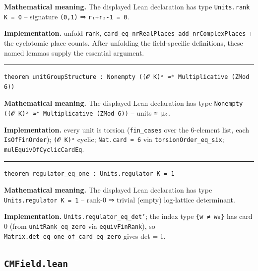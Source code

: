 \documentclass[UTF8,a4paper,11pt,fontset=fandol]{ctexart}
\theoremstyle{definition}
\newcommand{\statementsep}{\par\medskip\hrule\medskip}
\begin{document}
\noindent\textbf{Mathematical meaning.} The displayed Lean declaration has type \texttt{Units.\allowbreak{}rank K = 0} -- signature \texttt{(0,1)} ⇒ \texttt{r₁+r₂-1 = 0}.\par
\noindent\textbf{Implementation.} unfold \texttt{rank}, \texttt{card\_\allowbreak{}eq\_\allowbreak{}nrRealPlaces\_\allowbreak{}add\_\allowbreak{}nrComplexPlaces} + the cyclotomic place counts. After unfolding the field-specific definitions, these named lemmas supply the essential argument.\par
\statementsep
\begin{verbatim}
theorem unitGroupStructure : Nonempty ((𝓞 K)ˣ ≃* Multiplicative (ZMod 6))
\end{verbatim}
\noindent\textbf{Mathematical meaning.} The displayed Lean declaration has type \texttt{Nonempty ((𝓞 K)ˣ ≃* Multiplicative (ZMod 6))} -- units \texttt{≅ μ₆}.\par
\noindent\textbf{Implementation.} every unit is torsion (\texttt{fin\_\allowbreak{}cases} over the 6-element list, each \texttt{IsOfFinOrder}); \texttt{(𝓞 K)ˣ} cyclic; \texttt{Nat.\allowbreak{}card = 6} via \texttt{torsionOrder\_\allowbreak{}eq\_\allowbreak{}six}; \texttt{mulEquivOfCyclicCardEq}.\par
\statementsep
\begin{verbatim}
theorem regulator_eq_one : Units.regulator K = 1
\end{verbatim}
\noindent\textbf{Mathematical meaning.} The displayed Lean declaration has type \texttt{Units.\allowbreak{}regulator K = 1} -- rank-0 ⇒ trivial (empty) log-lattice determinant.\par
\noindent\textbf{Implementation.} \texttt{Units.\allowbreak{}regulator\_\allowbreak{}eq\_\allowbreak{}det'}; the index type \texttt{\{w ≠ w₀\}} has card 0 (from \texttt{unitRank\_\allowbreak{}eq\_\allowbreak{}zero} via \texttt{equivFinRank}), so \texttt{Matrix.\allowbreak{}det\_\allowbreak{}eq\_\allowbreak{}one\_\allowbreak{}of\_\allowbreak{}card\_\allowbreak{}eq\_\allowbreak{}zero} gives det = 1.\par

\subsection{\texttt{CMField.lean}}
\end{document}
